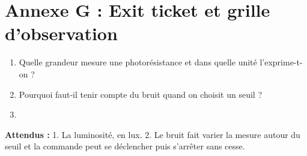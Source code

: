 \documentclass[11pt,a4paper]{article}
\begin{document}
\newpage
\section*{Annexe G : Exit ticket et grille d'observation}

\begin{enumerate}
 \item Quelle grandeur mesure une photorésistance et dans quelle unité l'exprime-t-on ?\\ \lig
 \item Pourquoi faut-il tenir compte du bruit quand on choisit un seuil ?\\ \lig
 \item \autoeval
\end{enumerate}
\textbf{Attendus :} 1. La luminosité, en lux. 2. Le bruit fait varier la mesure autour du seuil et la commande peut se déclencher puis s'arrêter sans cesse.

\bigskip
{}
\end{document}
